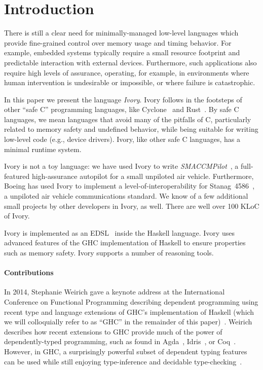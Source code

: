 \section{Introduction}
\label{sec:introduction}


There is still a clear need for minimally-managed low-level languages
which provide fine-grained control over memory usage and timing
behavior.  For example, embedded systems typically require a small
resource footprint and predictable interaction with external devices.
Furthermore, such applications also require high levels of assurance,
operating, for example, in environments where human intervention is
undesirable or impossible, or where failure is catastrophic.

In this paper we present the language \emph{Ivory}.  Ivory follows in
the footsteps of other ``safe C'' programming languages, like
Cyclone~\cite{cyclone} and Rust~\cite{rust}. By safe C languages, we
mean languages that avoid many of the pitfalls of C, particularly
related to memory safety and undefined behavior, while being suitable for
writing low-level code (e.g., device drivers). Ivory, like other safe
C languages, has a minimal runtime system.

Ivory is not a toy language: we have used Ivory to write
\emph{SMACCMPilot}~\cite{smaccm}, a full-featured high-assurance
autopilot for a small unpiloted air vehicle.  Furthermore, Boeing has
used Ivory to implement a level-of-interoperability for
Stanag~4586~\cite{stanag}, a unpiloted air vehicle communications
standard. We know of a few additional small projects by other
developers in Ivory, as well.  There are well over 100 KLoC of Ivory.

Ivory is implemented as an EDSL~\cite{edsl} inside the Haskell
language.  Ivory uses advanced features of the GHC implementation of
Haskell to ensure properties such as memory safety.  Ivory supports a
number of reasoning tools.

\paragraph{Contributions}
In 2014, Stephanie Weirich gave a keynote address at the International
Conference on Functional Programming describing dependent programming using
recent type and language extensions of GHC's implementation of Haskell (which we
will colloquially refer to as ``GHC'' in the remainder of this
paper)~\cite{weirich-keynote}. Weirich describes how recent extensions to GHC
provide much of the power of dependently-typed programming, such as found in
Agda~\cite{agda}, Idris~\cite{idris}, or Coq~\cite{coq}. However, in GHC, a surprisingly
powerful subset of dependent typing features can be used while still enjoying
type-inference and decidable type-checking~\cite{dephaskell}.


